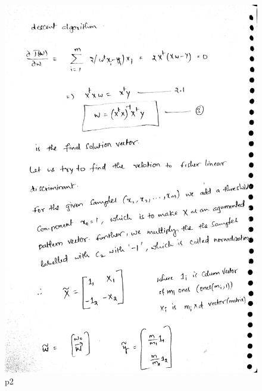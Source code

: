 \documentclass[10pt,a4paper]{article}
\begin{document}
\begin{figure}[!h]
\includegraphics[scale=0.03]{images/p4A2_2.jpg}	
  \caption{p2}
  \label{fig:C34T2}
\end{figure}
\graphicspath{ {/images/} }
\end{document}

